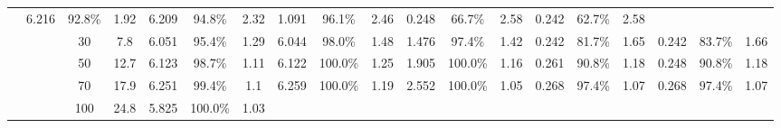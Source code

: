 \documentclass[letterpaper]{article}
\begin{document}
\begin{table*}[]
\begin{tabular}{|c|c|cc|ccc|ccc|ccc|ccc|ccc|}
		& 6.216 & 92.8\% & 1.92 	 

		& 6.209 & 94.8\% & 2.32 	 

		& 1.091 & 96.1\% & 2.46 	 

		& 0.248 & 66.7\% & 2.58 	 

		& 0.242 & 62.7\% & 2.58 	 

	\\ & & 30	 & 7.8

		& 6.051 & 95.4\% & 1.29 	 

		& 6.044 & 98.0\% & 1.48 	 

		& 1.476 & 97.4\% & 1.42 	 

		& 0.242 & 81.7\% & 1.65 	 

		& 0.242 & 83.7\% & 1.66 	 

	\\ & & 50	 & 12.7

		& 6.123 & 98.7\% & 1.11 	 

		& 6.122 & 100.0\% & 1.25 	 

		& 1.905 & 100.0\% & 1.16 	 

		& 0.261 & 90.8\% & 1.18 	 

		& 0.248 & 90.8\% & 1.18 	 

	\\ & & 70	 & 17.9

		& 6.251 & 99.4\% & 1.1 	 

		& 6.259 & 100.0\% & 1.19 	 

		& 2.552 & 100.0\% & 1.05 	 

		& 0.268 & 97.4\% & 1.07 	 

		& 0.268 & 97.4\% & 1.07 	 

	\\ & & 100	 & 24.8

		& 5.825 & 100.0\% & 1.03 	 


\end{tabular}
\end{table*}
\end{document}
